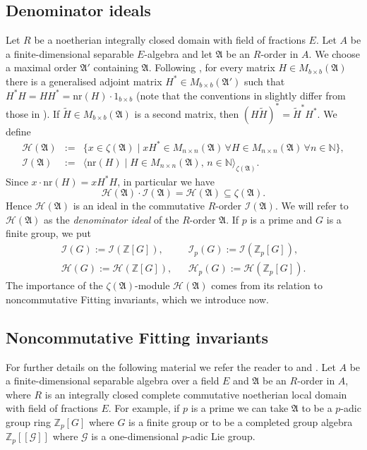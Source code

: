 \documentclass[12pt]{amsart}
\theoremstyle{plain}
\theoremstyle{remark}
\theoremstyle{definition}
\numberwithin{equation}{section}
\begin{document}
\subsection{Denominator ideals}\label{subsec:denom-ideals}
Let $R$ be a noetherian integrally closed domain with field of fractions $E$.
Let $A$ be a finite-dimensional separable $E$-algebra and let $\mathfrak{A}$ be an $R$-order in $A$.
We choose a maximal order $\mathfrak{A}'$ containing $\mathfrak{A}$.
Following \cite[\S 3.6]{MR3092262}, for every matrix $H \in M_{b \times b} (\mathfrak{A})$ there is a generalised adjoint matrix
$H^{\ast} \in M_{b\times b}(\mathfrak{A}')$ such that $H^{\ast} H = H H^{\ast} = {\mathrm{nr}} (H) \cdot 1_{b \times b}$
(note that the conventions in \cite[\S 3.6]{MR3092262} slightly differ from those in  \cite{MR2609173}).
If $\tilde{H} \in M_{b \times b} (\mathfrak{A})$ is a second matrix, then $(H \tilde{H})^{\ast} = \tilde{H}^{\ast} H^{\ast}$.
We define
\begin{eqnarray*}
\mathcal{H}(\mathfrak{A}) & := &
\{ x \in \zeta(\mathfrak{A}) \mid xH^{\ast} \in M_{n \times n}(\mathfrak{A}) \, \forall H \in M_{n \times n}(\mathfrak{A}) \, \forall n \in {\mathbb{N}} \},\\
\mathcal{I}(\mathfrak{A}) & := &
\langle {\mathrm{nr}}(H) \mid H \in  M_{n \times n}(\mathfrak{A}), \,  n \in {\mathbb{N}}\rangle_{\zeta(\mathfrak{A})}.
\end{eqnarray*}
Since $x \cdot {\mathrm{nr}}(H) = x H^{\ast} H$, in particular we have
\[
\mathcal{H}(\mathfrak{A}) \cdot \mathcal I(\mathfrak{A}) = \mathcal{H}(\mathfrak{A}) \subseteq \zeta(\mathfrak{A}).
\]
Hence $\mathcal{H}(\mathfrak{A})$ is an ideal in the commutative $R$-order $\mathcal{I}(\mathfrak{A})$.
We will refer to $\mathcal{H}(\mathfrak{A})$ as the \emph{denominator ideal} of the $R$-order $\mathfrak{A}$.
If $p$ is a prime and $G$ is a finite group, we put
\begin{eqnarray*}
\mathcal{I}(G) := \mathcal{I}({\mathbb{Z}}[G]), & &  \mathcal{I}_{p}(G) := \mathcal{I}({\mathbb{Z}}_{p}[G]), \\
\mathcal{H}(G) := \mathcal{H}({\mathbb{Z}}[G]), & &  \mathcal{H}_{p}(G) := \mathcal{H}({\mathbb{Z}}_{p}[G]).
\end{eqnarray*}
The importance of the $\zeta(\mathfrak{A})$-module $\mathcal{H}(\mathfrak{A})$
comes from its relation to noncommutative Fitting invariants, which we introduce now.

\subsection{Noncommutative Fitting invariants}
For further details on the following material we refer the reader to \cite{MR2609173} and \cite{MR3092262}.
Let $A$ be a finite-dimensional separable algebra over a field $E$ and $\mathfrak{A}$ be an $R$-order in $A$, where $R$ is an integrally closed complete commutative noetherian local domain with field of fractions $E$.
For example, if $p$ is a prime we can take $\mathfrak{A}$ to be a $p$-adic group ring ${\mathbb{Z}}_{p}[G]$
where $G$ is a finite group or to be a completed group algebra ${\mathbb{Z}}_{p}[[\mathcal{G}]]$ where $\mathcal{G}$
is a one-dimensional $p$-adic Lie group.
\end{document}
